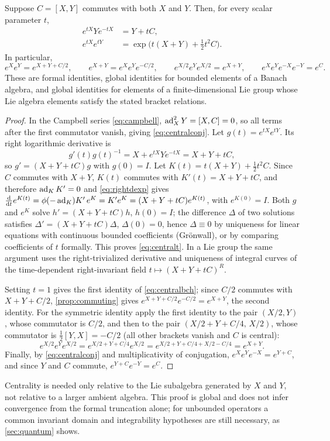 \begin{theorem}\label{thm:central}
Suppose $C=[X,Y]$ commutes with both $X$ and $Y$. Then, for every scalar
parameter $t$,
\begin{align}
 e^{tX}Ye^{-tX}&=Y+tC,\label{eq:centralconj}\\
 e^{tX}e^{tY}&=\exp\bigl(t(X+Y)+\tfrac12t^2C\bigr).\label{eq:centralt}
\end{align}
In particular,
\begin{equation}\label{eq:centralbch}
 e^Xe^Y=e^{X+Y+C/2},\qquad
 e^{X+Y}=e^Xe^Ye^{-C/2},\qquad
 e^{X/2}e^Ye^{X/2}=e^{X+Y},\qquad
 e^Xe^Ye^{-X}e^{-Y}=e^{C}.
\end{equation}
These are formal identities, global identities for bounded elements of a
Banach algebra, and global identities for elements of a finite-dimensional
Lie group whose Lie algebra elements satisfy the stated bracket relations.
\end{theorem}
\begin{proof}
In the Campbell series \eqref{eq:campbell}, $\operatorname{ad}_X^2Y=[X,C]=0$, so all
terms after the first commutator vanish, giving \eqref{eq:centralconj}.
Let $g(t)=e^{tX}e^{tY}$. Its right logarithmic derivative is
\[
 g'(t)g(t)^{-1}=X+e^{tX}Ye^{-tX}=X+Y+tC,
\]
so $g'=(X+Y+tC)g$ with $g(0)=I$. Let $K(t)=t(X+Y)+\frac12t^2C$. Since $C$
commutes with $X+Y$, $K(t)$ commutes with $K'(t)=X+Y+tC$, and therefore
$\operatorname{ad}_{K}K'=0$ and \eqref{eq:rightdexp} gives
$\frac{\mathrm{d}}{\mathrm{d} t}e^{K(t)}=\phi(-\operatorname{ad}_K)K'\,e^{K}=K'e^{K}=(X+Y+tC)e^{K(t)}$,
with $e^{K(0)}=I$. Both $g$ and $e^{K}$ solve $h'=(X+Y+tC)h$, $h(0)=I$;
the difference $\Delta$ of two solutions satisfies
$\Delta'=(X+Y+tC)\Delta$, $\Delta(0)=0$, hence $\Delta\equiv0$ by
uniqueness for linear equations with continuous bounded coefficients
(Gr\"onwall), or by comparing coefficients of $t$ formally. This proves
\eqref{eq:centralt}. In a Lie group the same argument uses the
right-trivialized derivative and uniqueness of integral curves of the
time-dependent right-invariant field $t\mapsto(X+Y+tC)^R$.

Setting $t=1$ gives the first identity of \eqref{eq:centralbch}; since
$C/2$ commutes with $X+Y+C/2$, \cref{prop:commuting} gives
$e^{X+Y+C/2}e^{-C/2}=e^{X+Y}$, the second identity. For the symmetric
identity apply the first identity to the pair $(X/2,Y)$, whose commutator
is $C/2$, and then to the pair $(X/2+Y+C/4,\,X/2)$, whose commutator is
$\frac12[Y,X]=-C/2$ (all other brackets vanish and $C$ is central):
\[
 e^{X/2}e^Ye^{X/2}=e^{X/2+Y+C/4}e^{X/2}=e^{X/2+Y+C/4+X/2-C/4}=e^{X+Y}.
\]
Finally, by \eqref{eq:centralconj} and multiplicativity of conjugation,
$e^Xe^Ye^{-X}=e^{Y+C}$, and since $Y$ and $C$ commute,
$e^{Y+C}e^{-Y}=e^{C}$.
\end{proof}
Centrality is needed only relative to the Lie subalgebra generated by $X$
and $Y$, not relative to a larger ambient algebra. This proof is global and
does not infer convergence from the formal truncation alone; for unbounded
operators a common invariant domain and integrability hypotheses are still
necessary, as \cref{sec:quantum} shows.

